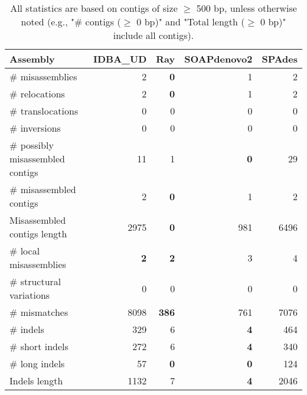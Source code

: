 \documentclass[12pt,a4paper]{article}
\begin{document}
\begin{table}[ht]
\begin{center}
\caption{All statistics are based on contigs of size $\geq$ 500 bp, unless otherwise noted (e.g., "\# contigs ($\geq$ 0 bp)" and "Total length ($\geq$ 0 bp)" include all contigs).}
\begin{tabular}{|l*{4}{|r}|}
\hline
Assembly & IDBA\_UD & Ray & SOAPdenovo2 & SPAdes \\ \hline
\# misassemblies & 2 & {\bf 0} & 1 & 2 \\ \hline
\hspace{5mm}\# relocations & 2 & {\bf 0} & 1 & 2 \\ \hline
\hspace{5mm}\# translocations & 0 & 0 & 0 & 0 \\ \hline
\hspace{5mm}\# inversions & 0 & 0 & 0 & 0 \\ \hline
\# possibly misassembled contigs & 11 & 1 & {\bf 0} & 29 \\ \hline
\# misassembled contigs & 2 & {\bf 0} & 1 & 2 \\ \hline
Misassembled contigs length & 2975 & {\bf 0} & 981 & 6496 \\ \hline
\# local misassemblies & {\bf 2} & {\bf 2} & 3 & 4 \\ \hline
\# structural variations & 0 & 0 & 0 & 0 \\ \hline
\# mismatches & 8098 & {\bf 386} & 761 & 7076 \\ \hline
\# indels & 329 & 6 & {\bf 4} & 464 \\ \hline
\hspace{5mm}\# short indels & 272 & 6 & {\bf 4} & 340 \\ \hline
\hspace{5mm}\# long indels & 57 & {\bf 0} & {\bf 0} & 124 \\ \hline
Indels length & 1132 & 7 & {\bf 4} & 2046 \\ \hline
\end{tabular}
\end{center}
\end{table}
\end{document}
